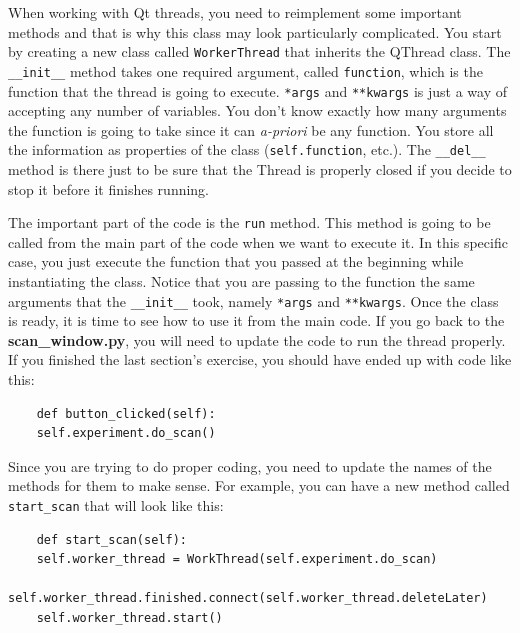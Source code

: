 When working with Qt threads, you need to reimplement some important
methods and that is why this class may look particularly complicated.
You start by creating a new class called \texttt{WorkerThread} that
inherits the QThread class. The \texttt{__init__} method takes one
required argument, called \texttt{function}, which is the function that
the thread is going to execute. \texttt{*args} and \texttt{**kwargs} is
just a way of accepting any number of variables. You don't know exactly
how many arguments the function is going to take since it can
\emph{a-priori} be any function. You store all the information as
properties of the class (\texttt{self.function}, etc.). The
\texttt{__del__} method is there just to be sure that the Thread is
properly closed if you decide to stop it before it finishes running.

The important part of the code is the \texttt{run} method. This method
is going to be called from the main part of the code when we want to
execute it. In this specific case, you just execute the function that
you passed at the beginning while instantiating the class. Notice that
you are passing to the function the same arguments that the
\texttt{__init__} took, namely \texttt{*args} and \texttt{**kwargs}.
Once the class is ready, it is time to see how to use it from the main
code. If you go back to the \textbf{scan\_window.py}, you will need to
update the code to run the thread properly. If you finished the last
section's exercise, you should have ended up with code like this:

\begin{verbatim}
    def button_clicked(self):
    self.experiment.do_scan()
\end{verbatim}

Since you are trying to do proper coding, you need to update the names
of the methods for them to make sense. For example, you can have a new
method called \texttt{start_scan} that will look like this:

\begin{verbatim}
    def start_scan(self):
    self.worker_thread = WorkThread(self.experiment.do_scan)
    self.worker_thread.finished.connect(self.worker_thread.deleteLater)
    self.worker_thread.start()
\end{verbatim}

